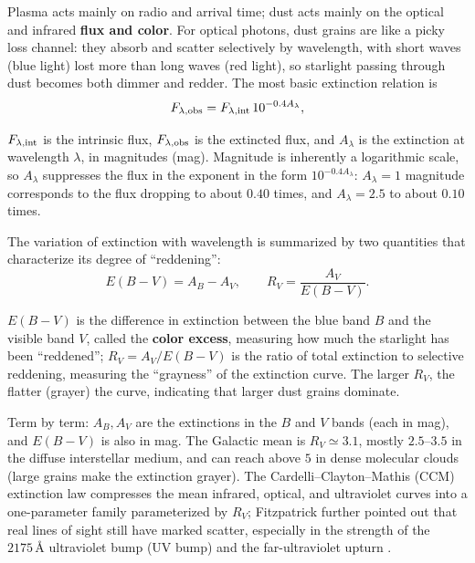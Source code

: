 Plasma acts mainly on radio and arrival time; dust acts mainly on the optical and infrared \textbf{flux and color}. For optical photons, dust grains are like a picky loss channel: they absorb and scatter selectively by wavelength, with short waves (blue light) lost more than long waves (red light), so starlight passing through dust becomes both dimmer and redder. The most basic extinction relation is
\begin{equation}
  F_{\lambda,{\rm obs}}
  =
  F_{\lambda,{\rm int}}\,10^{-0.4A_\lambda},
  \label{eq:e21-extinction-flux}
\end{equation}
\begin{formulaexplain}
\(F_{\lambda,{\rm int}}\) is the intrinsic flux, \(F_{\lambda,{\rm obs}}\) is the extincted flux, and \(A_\lambda\) is the extinction at wavelength \(\lambda\), in magnitudes (mag). Magnitude is inherently a logarithmic scale, so \(A_\lambda\) suppresses the flux in the exponent in the form \(10^{-0.4A_\lambda}\): \(A_\lambda=1\) magnitude corresponds to the flux dropping to about \(0.40\) times, and \(A_\lambda=2.5\) to about \(0.10\) times.
\end{formulaexplain}
The variation of extinction with wavelength is summarized by two quantities that characterize its degree of ``reddening'':
\begin{equation}
  E(B-V)=A_B-A_V,
  \qquad
  R_V=\frac{A_V}{E(B-V)}.
  \label{eq:e21-rv-definition}
\end{equation}
\begin{formulaexplain}
\(E(B-V)\) is the difference in extinction between the blue band \(B\) and the visible band \(V\), called the \textbf{color excess}, measuring how much the starlight has been ``reddened''; \(R_V=A_V/E(B-V)\) is the ratio of total extinction to selective reddening, measuring the ``grayness'' of the extinction curve. The larger \(R_V\), the flatter (grayer) the curve, indicating that larger dust grains dominate.
\end{formulaexplain}
Term by term: \(A_B,A_V\) are the extinctions in the \(B\) and \(V\) bands (each in mag), and \(E(B-V)\) is also in mag. The Galactic mean is \(R_V\simeq3.1\), mostly \(2.5\text{--}3.5\) in the diffuse interstellar medium, and can reach above \(5\) in dense molecular clouds (large grains make the extinction grayer). The Cardelli--Clayton--Mathis (CCM) extinction law compresses the mean infrared, optical, and ultraviolet curves into a one-parameter family parameterized by \(R_V\); Fitzpatrick further pointed out that real lines of sight still have marked scatter, especially in the strength of the \(2175\,\text{\AA}\) ultraviolet bump (UV bump) and the far-ultraviolet upturn \citep{1989ApJ...345..245C,1999PASP..111...63F,2003ARA&A..41..241D}.

